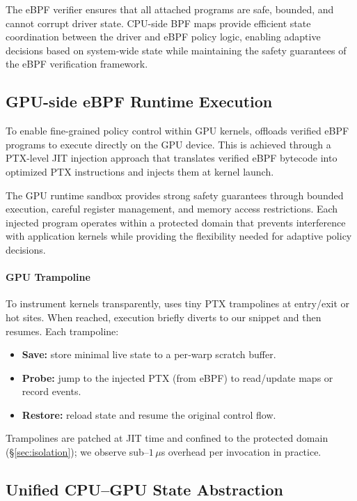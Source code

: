 The eBPF verifier ensures that all attached programs are safe, bounded, and cannot corrupt driver state. CPU-side BPF maps provide efficient state coordination between the driver and eBPF policy logic, enabling adaptive decisions based on system-wide state while maintaining the safety guarantees of the eBPF verification framework.

\subsection{GPU-side eBPF Runtime Execution}

To enable fine-grained policy control within GPU kernels, \sys offloads verified eBPF programs to execute directly on the GPU device. This is achieved through a PTX-level JIT injection approach that translates verified eBPF bytecode into optimized PTX instructions and injects them at kernel launch.

The GPU runtime sandbox provides strong safety guarantees through bounded execution, careful register management, and memory access restrictions. Each injected program operates within a protected domain that prevents interference with application kernels while providing the flexibility needed for adaptive policy decisions.

\paragraph{GPU Trampoline}\label{sec:gpu_trampoline}
To instrument kernels transparently, \sys{} uses tiny PTX trampolines at entry/exit or hot sites. When reached, execution briefly diverts to our snippet and then resumes. Each trampoline:
\begin{itemize}[leftmargin=*,itemsep=0pt]
  \item \textbf{Save:} store minimal live state to a per‐warp scratch buffer.
  \item \textbf{Probe:} jump to the injected PTX (from eBPF) to read/update maps or record events.
  \item \textbf{Restore:} reload state and resume the original control flow.
\end{itemize}
Trampolines are patched at JIT time and confined to the protected domain (\S\ref{sec:isolation}); we observe sub--\(1\,\mu\)s overhead per invocation in practice.

\subsection{Unified CPU--GPU State Abstraction}

